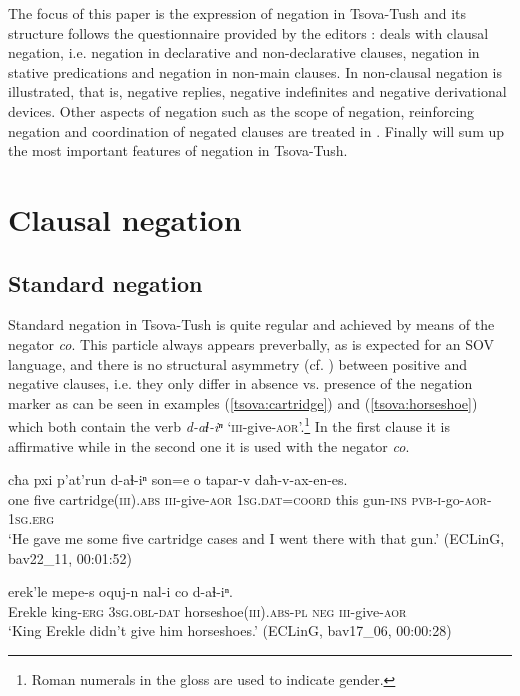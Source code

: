 \documentclass[output=paper,%
colorlinks,citecolor=brown,
showindex
]{langscibook}
\begin{document}
The focus of this paper is the expression of negation in Tsova-Tush and its structure follows the questionnaire provided by the editors :  deals with clausal negation, i.e. negation in declarative and non-declarative clauses, negation in stative predications and negation in non-main clauses. In  non-clausal negation is illustrated, that is, negative replies, negative indefinites and negative derivational devices. Other aspects of negation such as the scope of negation, reinforcing negation and coordination of negated clauses are treated in . Finally  will sum up the most important features of negation in Tsova-Tush.

\section{Clausal negation} 
\label{tsova:clausalnegation}

\subsection{Standard negation}
\label{tsova:standardnegation}

Standard negation in Tsova-Tush is quite regular and achieved by means of the negator \textit{co}. This particle always appears preverbally, as is expected for an SOV language, and there is no structural asymmetry (cf. \citealt{Miestamo2005}) between positive and negative clauses, i.e. they only differ in absence vs. presence of the negation marker as can be seen in examples (\ref{tsova:cartridge}) and (\ref{tsova:horseshoe}) which both contain the verb \textit{d-aɬ-iⁿ} `\textsc{iii}-give-\textsc{aor}'.\footnote{Roman numerals in the gloss are used to indicate gender.} In the first clause it is affirmative while in the second one it is used with the negator \textit{co}.

\ea	\label{tsova:cartridge}
\gll 	cħa     pxi p'at'run d-aɬ-iⁿ son=e o tapar-v daħ-v-ax-en-es.\\  
	one five cartridge\textsc{(iii).abs} \textsc{iii}-give-\textsc{aor} \textsc{1sg.dat=coord} this gun-\textsc{ins} \textsc{pvb-i}-go-\textsc{aor-1sg.erg}\\
\glt `He gave me some five cartridge cases and I went there with that gun.' (ECLinG, bav22\_11, 00:01:52)
\z

\ea	\label{tsova:horseshoe}
\gll 	erek'le mepe-s oquj-n nal-i co d-aɬ-iⁿ.\\  
	Erekle king-\textsc{erg}  \textsc{3sg}.\textsc{obl}-\textsc{dat} horseshoe\textsc{(iii).abs}-\textsc{pl} \textsc{neg} \textsc{iii}-give-\textsc{aor}\\
\glt `King Erekle didn't give him horseshoes.' (ECLinG, bav17\_06, 00:00:28)
\z
\end{document}
